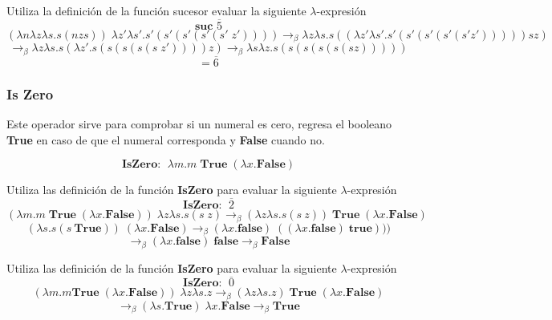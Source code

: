         \begin{exercise}
            Utiliza la definición de la función sucesor evaluar la siguiente  $\lambda$-expresión
            \[
                \textbf{suc } \overline{5}
            \]
            \[
                (\lambda n\lambda z\lambda s.s(n z s) ) \; \lambda z'\lambda s'.s'(s'(s'(s'(s' \; z')))) \rightarrow_\beta \lambda z\lambda s.s((\lambda z'\lambda s'.s'(s'(s'(s'(s'z'))))) s z)
            \]
            \[
                \rightarrow_\beta \lambda z\lambda s.s(\lambda z'.s(s(s(s(s\;z')))) z) \rightarrow_\beta \lambda s\lambda z.s(s(s(s(s(sz)))))
            \]
            \[
                = \overline{6}
            \]
        \end{exercise}

        \subsubsection{Is Zero}
        Este operador sirve para comprobar si un numeral es cero, regresa el booleano \textbf{True} en caso de que el numeral corresponda y \textbf{False} cuando no.\\
        \begin{definition}
            $$\textbf{IsZero: } \; \lambda m. m\;\textbf{True} \;(\lambda x.\textbf{False})$$
        \end{definition}

        \begin{exercise}
            Utiliza las definición de la función \textbf{IsZero} para evaluar la siguiente $\lambda$-expresión
            \[
                \textbf{IsZero: } \; \overline{2}
            \]
            \[
                (\lambda m. m\;\textbf{True} \;(\lambda x.\textbf{False})) \; \lambda z\lambda s.s(s\;z) \rightarrow_\beta (\lambda z\lambda s.s(s\:z)) \; \textbf{True} \; (\lambda x.\textbf{False}) 
            \]
            \[
                (\lambda s.s(s\: \textbf{True})) \; (\lambda x.\textbf{False}) \rightarrow_\beta  (\lambda x.\textbf{false}) \; ((\lambda x.\textbf{false}) \; \textbf{true})))
            \]
            \[
                 \rightarrow_\beta  (\lambda x.\textbf{false}) \; \textbf{false} \rightarrow_\beta \textbf{False}
            \]

        \end{exercise}

        \begin{exercise}
            Utiliza las definición de la función \textbf{IsZero} para evaluar la siguiente $\lambda$-expresión
            \[
                \textbf{IsZero: } \; \overline{0}
            \]
            \[
                (\lambda m. m\textbf{True} \; (\lambda x.\textbf{False})) \; \lambda z\lambda s.z \rightarrow_\beta (\lambda z\lambda s.z) \; \textbf{True} \; (\lambda x.\textbf{False})
            \]
            \[
                \rightarrow_\beta (\lambda s.\textbf{True}) \; \lambda x.\textbf{False} \rightarrow_\beta \textbf{True}
            \]
        \end{exercise}
        

